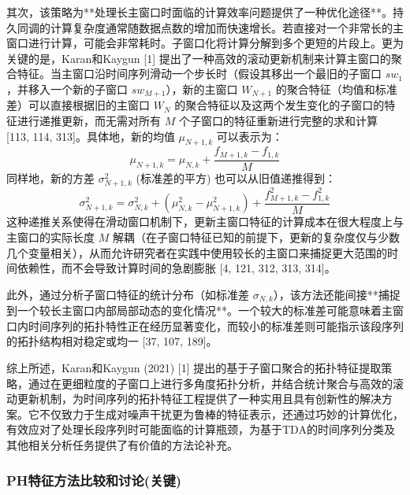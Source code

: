         其次，该策略为**处理长主窗口时面临的计算效率问题提供了一种优化途径**。持久同调的计算复杂度通常随数据点数的增加而快速增长。若直接对一个非常长的主窗口进行计算，可能会非常耗时。子窗口化将计算分解到多个更短的片段上。更为关键的是，Karan和Kaygun [1] 提出了一种高效的滚动更新机制来计算主窗口的聚合特征。当主窗口沿时间序列滑动一个步长时（假设其移出一个最旧的子窗口 $sw_1$，并移入一个新的子窗口 $sw_{M+1}$），新的主窗口 $W_{N+1}$ 的聚合特征（均值和标准差）可以直接根据旧的主窗口 $W_N$ 的聚合特征以及这两个发生变化的子窗口的特征进行递推更新，而无需对所有 $M$ 个子窗口的特征重新进行完整的求和计算 [113, 114, 313]。具体地，新的均值 $\mu_{N+1,k}$ 可以表示为：
        \begin{equation}
            \mu_{N+1,k} = \mu_{N,k} + \frac{f_{M+1,k} - f_{1,k}}{M}
            \label{eq:recursive_mean}
        \end{equation}
        同样地，新的方差 $\sigma_{N+1,k}^2$ (标准差的平方) 也可以从旧值递推得到：
        \begin{equation}
            \sigma_{N+1,k}^2 = \sigma_{N,k}^2 + (\mu_{N,k}^2 - \mu_{N+1,k}^2) + \frac{f_{M+1,k}^2 - f_{1,k}^2}{M}
            \label{eq:recursive_variance}
        \end{equation}
        这种递推关系使得在滑动窗口机制下，更新主窗口特征的计算成本在很大程度上与主窗口的实际长度 $M$ 解耦（在子窗口特征已知的前提下，更新的复杂度仅与少数几个变量相关），从而允许研究者在实践中使用较长的主窗口来捕捉更大范围的时间依赖性，而不会导致计算时间的急剧膨胀 [4, 121, 312, 313, 314]。
        
        此外，通过分析子窗口特征的统计分布（如标准差 $\sigma_{N,k}$），该方法还能间接**捕捉到一个较长主窗口内部局部动态的变化情况**。一个较大的标准差可能意味着主窗口内时间序列的拓扑特性正在经历显著变化，而较小的标准差则可能指示该段序列的拓扑结构相对稳定或均一 [37, 107, 189]。
        
        综上所述，Karan和Kaygun (2021) [1] 提出的基于子窗口聚合的拓扑特征提取策略，通过在更细粒度的子窗口上进行多角度拓扑分析，并结合统计聚合与高效的滚动更新机制，为时间序列的拓扑特征工程提供了一种实用且具有创新性的解决方案。它不仅致力于生成对噪声干扰更为鲁棒的特征表示，还通过巧妙的计算优化，有效应对了处理长段序列时可能面临的计算瓶颈，为基于TDA的时间序列分类及其他相关分析任务提供了有价值的方法论补充。
        
        \subsubsection{PH特征方法比较和讨论(关键)}
            \label{sec:tda_features_discussion}


